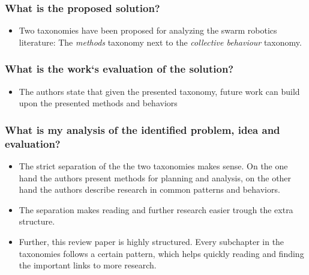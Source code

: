     \subsubsection*{What is the proposed solution?}
    \begin{itemize}
        \item Two taxonomies have been proposed for analyzing the swarm robotics literature: The \emph{methods} taxonomy next to the \emph{collective behaviour} taxonomy.
    \end{itemize}
    \subsubsection*{What is the work`s evaluation of the solution?}
    \begin{itemize}
        \item The authors state that given the presented taxonomy, future work can build upon the presented methods and behaviors
    \end{itemize}
    \subsubsection*{What is my analysis of the identified problem, idea and evaluation?}
    \begin{itemize}
        \item The strict separation of the the two taxonomies makes sense. On the one hand the authors present methods for planning and analysis, on the other hand the authors describe research in common patterns and behaviors.
        \item The separation makes reading and further research easier trough the extra structure.
        \item Further, this review paper is highly structured. Every subchapter in the taxonomies follows a certain pattern, which helps quickly reading and finding the important links to more research. 
    \end{itemize}
